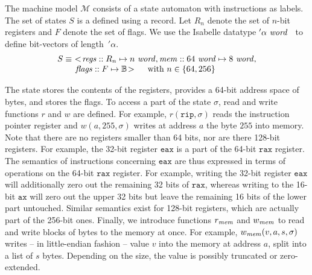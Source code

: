 The machine model $\mathcal{M}$ consists of a state automaton with instructions as labels.
The set of states $S$ is a defined using a record.
Let $R_n$ denote the set of $n$-bit registers and $F$ denote the set of flags.
We use the Isabelle datatype $'\alpha~\mathit{word}$~\cite{dawson2009isabelle} to define bit-vectors of length~$'\alpha$.
\[
\begin{array}{l}
	S \equiv~
    <\!\mathit{regs} :: R_n \mapsto n~\mathit{word},  \mathit{mem} :: 64~\mathit{word} \mapsto 8~\mathit{word}, \\
    \mbox{\hspace{5ex}}\mathit{flags} :: F \mapsto \mathbb{B}\!>
	\mbox{\hspace{3ex}with~} n \in \{64,256\}
\end{array}
\]

The state stores the contents of the registers, provides a 64-bit address space of bytes, and stores the flags.
To access a part of the state $\sigma$, read and write functions $r$ and $w$ are defined. For example, $r(\mathtt{rip}, \sigma)$ reads the instruction pointer register and $w(a,255,\sigma)$ writes at address $a$ the byte $255$ into memory.
Note that there are no registers smaller than 64 bits, nor are there 128-bit registers.
For example, the 32-bit register $\mathtt{eax}$ is a part of the 64-bit $\mathtt{rax}$ register.
The semantics of instructions concerning $\mathtt{eax}$ are thus expressed in terms of operations on the 64-bit $\mathtt{rax}$ register.
For example, writing the 32-bit register $\mathtt{eax}$ will additionally zero out the remaining 32 bits of $\mathtt{rax}$, whereas writing to the 16-bit $\mathtt{ax}$ will zero out the upper 32 bits but leave the remaining 16 bits of the lower part untouched.
Similar semantics exist for 128-bit registers, which are actually part of the 256-bit ones.
Finally, we introduce functions $r_{\mathit{mem}}$ and $w_{\mathit{mem}}$ to read and write blocks of bytes to the memory at once.
For example, $w_{\mathit{mem}}(v, a, s, \sigma)$ writes -- in little-endian fashion -- value $v$ into the memory at address $a$, split into a list of $s$ bytes.
Depending on the size, the value is possibly truncated or zero-extended.

